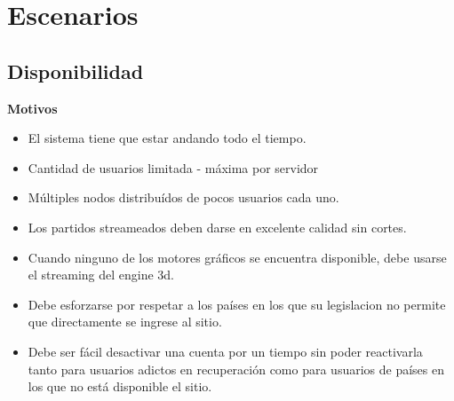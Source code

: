 \section{Escenarios}

\subsection{Disponibilidad}

\textbf{Motivos}
\begin{itemize}

\item El sistema tiene que estar andando todo el tiempo.
\item Cantidad de usuarios limitada - máxima por servidor
\item Múltiples nodos distribuídos de pocos usuarios cada uno.
\item Los partidos streameados deben darse en excelente calidad sin cortes.
\item Cuando ninguno de los motores gráficos se encuentra disponible, debe usarse el streaming del engine 3d.
\item Debe esforzarse por respetar a los países en los que su legislacion no permite que directamente se ingrese al sitio.
\item Debe ser fácil desactivar una cuenta por un tiempo sin poder reactivarla tanto para usuarios adictos en recuperación como para usuarios de países en los que no está disponible el sitio.
\end{itemize}


